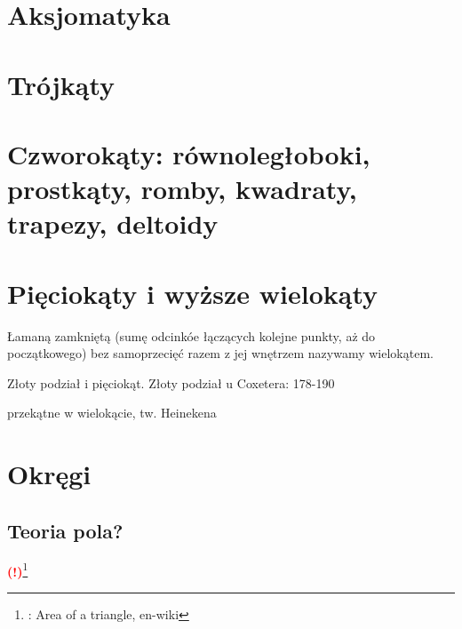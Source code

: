 \documentclass{greaseproof}
\newcommand{\todofoot}[1]{\textcolor{red}{\textbf{(!)}\footnote{\textbf{\color{red}{Do zrobienia}}: #1}}}
\begin{document}


\chapter{Aksjomatyka}


\chapter{Trójkąty}


\chapter{Czworokąty: równoległoboki, prostkąty, romby, kwadraty, trapezy, deltoidy}


\chapter{Pięciokąty i wyższe wielokąty}
\begin{definition}[wielokąt]
    Łamaną zamkniętą (sumę odcinkóe łączących kolejne punkty, aż do początkowego) bez samoprzecięć razem z jej wnętrzem nazywamy wielokątem.
\end{definition}


Złoty podział i pięciokąt.
Złoty podział u Coxetera: 178-190

%
przekątne w wielokącie, tw. Heinekena %

\chapter{Okręgi}


\section{Teoria pola?}
\todofoot{Area of a triangle, en-wiki} %
\end{document}
